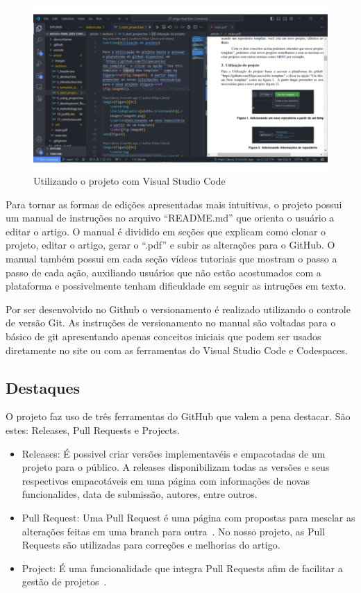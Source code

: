 \begin{itemize}
	\begin{figure}[H]
		\centering
		\includegraphics[width=.6\textwidth]{./images/fig01.png}
		\caption{Utilizando o projeto com Visual Studio Code}
		\label{fig:fig03}
	\end{figure}
\end{itemize}

Para tornar as formas de edições apresentadas mais intuitivas, o projeto possui um manual de instruções no arquivo ``README.md'' que orienta o usuário a editar o artigo. O manual é dividido em seções que explicam como clonar o projeto, editar o artigo, gerar o ``.pdf'' e subir as alterações para o GitHub. O manual também possui em cada seção vídeos tutoriais que mostram o passo a passo de cada ação, auxiliando usuários que não estão acostumados com a plataforma e possivelmente tenham dificuldade em seguir as intruções em texto.

Por ser desenvolvido no Github o versionamento é realizado utilizando o controle de versão Git. As instruções de versionamento no manual são voltadas para o básico de git apresentando apenas conceitos iniciais que podem ser usados diretamente no site ou com as ferramentas do Visual Studio Code e Codespaces.

\subsection{Destaques}
O projeto faz uso de três ferramentas do GitHub que valem a pena destacar. São estes: Releases, Pull Requests e Projects.
\begin{itemize}
	\item Releases: É possivel criar versões implementavéis e empacotadas de um projeto para o público. A releases disponibilizam todas as versões e seus respectivos empacotáveis em uma página com informações de novas funcionalides, data de submissão, autores, entre outros.~\cite{github:03}
	\item Pull Request: Uma Pull Request é uma página com propostas para mesclar as alterações feitas em uma branch para outra~\cite{github:04}. No nosso projeto, as Pull Requests são utilizadas para correções e melhorias do artigo.
	\item Project: É uma funcionalidade que integra Pull Requests afim de facilitar a gestão de projetos~\cite{github:05}.
\end{itemize}


